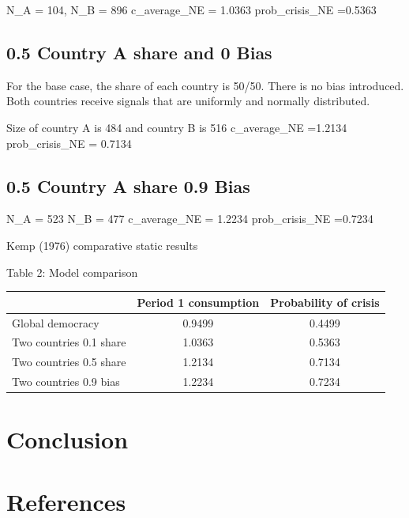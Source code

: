 \documentclass[11pt,preprint, authoryear]{elsarticle}
\numberwithin{equation}{section}
\numberwithin{figure}{section}
\numberwithin{table}{section}
\begin{document}
N\_A = 104, N\_B = 896 c\_average\_NE = 1.0363 prob\_crisis\_NE =0.5363

\hypertarget{country-a-share-and-0-bias}{%
\subsection*{0.5 Country A share and 0
Bias}\label{country-a-share-and-0-bias}}

For the base case, the share of each country is 50/50. There is no bias
introduced. Both countries receive signals that are uniformly and
normally distributed.

Size of country A is 484 and country B is 516 c\_average\_NE =1.2134
prob\_crisis\_NE = 0.7134

\hypertarget{country-a-share-0.9-bias}{%
\subsection*{0.5 Country A share 0.9
Bias}\label{country-a-share-0.9-bias}}

N\_A = 523 N\_B = 477 c\_average\_NE = 1.2234 prob\_crisis\_NE =0.7234

Kemp (1976) comparative static results

\begin{center}
Table 2: Model comparison
\end{center}

\begin{longtable}[]{@{}lcc@{}}
\toprule()
& Period 1 consumption & Probability of crisis \\
\midrule()
\endhead
Global democracy & 0.9499 & 0.4499 \\
Two countries 0.1 share & 1.0363 & 0.5363 \\
Two countries 0.5 share & 1.2134 & 0.7134 \\
Two countries 0.9 bias & 1.2234 & 0.7234 \\
\bottomrule()
\end{longtable}

\hypertarget{conclusion}{%
\section{Conclusion}\label{conclusion}}

\newpage

\hypertarget{references}{%
\section*{References}\label{references}}


\end{document}
